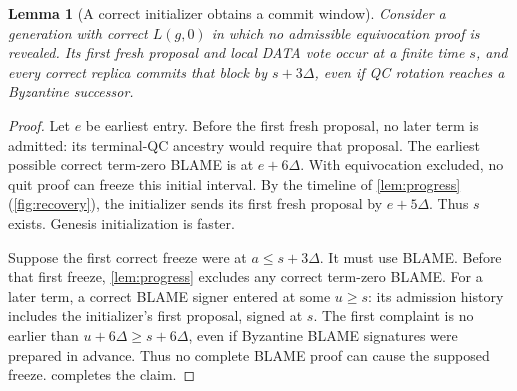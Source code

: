 \documentclass[11pt,a4paper]{article}
\newtheorem{lemma}[lemma]{Lemma}
\begin{document}
\begin{lemma}[A correct initializer obtains a commit window]
\label{lem:initializer}
Consider a generation with correct $L(g,0)$ in which no admissible
equivocation proof is revealed. Its first fresh proposal and local DATA
vote occur at a finite time $s$, and every correct replica commits that block by
$s+3\Delta$, even if QC rotation reaches a Byzantine successor.
\end{lemma}
\begin{proof}
Let $e$ be earliest entry. Before the first fresh proposal, no later
term is admitted: its terminal-QC ancestry would require that proposal.
The earliest possible correct term-zero BLAME is at $e+6\Delta$.
With equivocation excluded, no quit proof can freeze this initial interval.
By the timeline of \cref{lem:progress} (\cref{fig:recovery}), the
initializer sends its first fresh proposal by $e+5\Delta$.
 Thus $s$ exists. Genesis initialization is faster.

Suppose the first correct freeze were at $a\le s+3\Delta$.
It must use BLAME. Before that first freeze, \cref{lem:progress} excludes
any correct term-zero BLAME. For a later term, a correct BLAME signer
entered at some $u\ge s$: its admission history includes the
initializer's first proposal, signed at $s$. The first complaint is no
earlier than $u+6\Delta\ge s+6\Delta$, even if Byzantine BLAME
signatures were prepared in advance. Thus no complete BLAME proof can
cause the supposed freeze.  completes the claim.
\end{proof}
\end{document}
